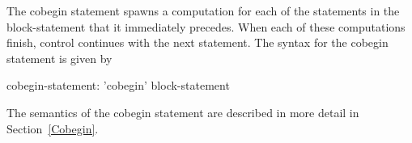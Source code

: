 The cobegin statement spawns a computation for each of the statements
in the block-statement that it immediately precedes.  When each of
these computations finish, control continues with the next statement.
The syntax for the cobegin statement is given by
\begin{syntax}
cobegin-statement:
  'cobegin' block-statement
\end{syntax}

The semantics of the cobegin statement are described in more detail in
Section~\ref{Cobegin}.

